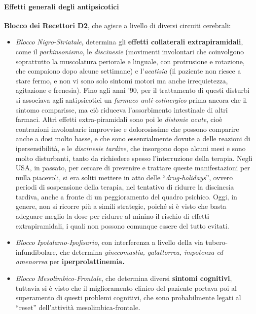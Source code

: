 \paragraph{Effetti generali degli antipsicotici}

\textbf{Blocco dei Recettori D2}, che agisce a livello di diversi
circuiti cerebrali:

\begin{itemize}
\item
  \emph{Blocco Nigro-Striatale}, determina gli \textbf{effetti
  collaterali extrapiramidali}, come il \emph{parkinsonismo}, le
  \emph{discinesie} (movimenti involontari che coinvolgono soprattutto
  la muscolatura periorale e linguale, con protrusione e rotazione, che
  compaiono dopo alcune settimane) e l'\emph{acatisia} (il paziente non
  riesce a stare fermo, e non vi sono solo sintomi motori ma anche
  irrequietezza, agitazione e frenesia). Fino agli anni '90, per il
  trattamento di questi disturbi si associava agli antipsicotici un
  \emph{farmaco anti-colinergico} prima ancora che il sintomo
  comparisse, ma ciò riduceva l'assorbimento intestinale di altri
  farmaci. Altri effetti extra-piramidali sono poi le \emph{distonie
  acute}, cioè contrazioni involontarie improvvise e dolorosissime che
  possono comparire anche a dosi molto basse, e che sono essenzialmente
  dovute a delle reazioni di ipersensibilità, e le \emph{discinesie
  tardive}, che insorgono dopo alcuni mesi e sono molto disturbanti,
  tanto da richiedere spesso l'interruzione della terapia. Negli USA, in
  passato, per cercare di prevenire e trattare queste manifestazioni per
  nulla piacevoli, si era soliti mettere in atto delle
  ``\emph{drug-holidays}'', ovvero periodi di sospensione della terapia,
  nel tentativo di ridurre la discinesia tardiva, anche a fronte di un
  peggioramento del quadro psichico. Oggi, in genere, non si ricorre più
  a simili strategie, poiché si è visto che basta adeguare meglio la
  dose per ridurre al minino il rischio di effetti extrapiramidali, i
  quali non possono comunque essere del tutto evitati.
\item
  \emph{Blocco Ipotalamo-Ipofisario}, con interferenza a livello della
  via tubero-infundibolare, che determina \emph{ginecomastia,
  galattorrea, impotenza ed amenorrea} per \textbf{iperprolattinemia.}
\item
  \emph{Blocco Mesolimbico-Frontale}, che determina diversi
  \textbf{sintomi cognitivi}, tuttavia si è visto che il miglioramento
  clinico del paziente portava poi al superamento di questi problemi
  cognitivi, che sono probabilmente legati al ``reset'' dell'attività
  mesolimbica-frontale.
\end{itemize}

